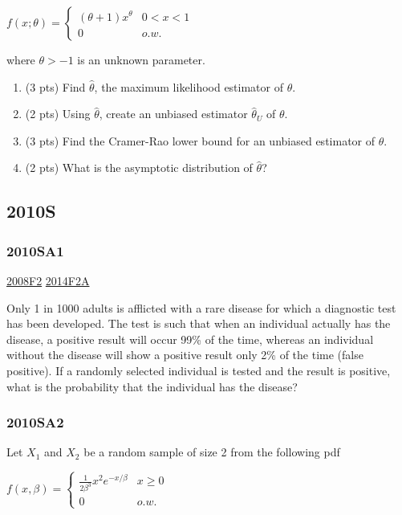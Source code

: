 \documentclass[6pt,twocolumn,Portrait]{article}
\begin{document}
\(f(x;\theta)=\begin{cases}(\theta+1)x^\theta& 0<x<1\\0& o.w.\end{cases}\)

where \(\theta>-1\) is an unknown parameter.

\begin{enumerate}
\def\labelenumi{(\alph{enumi})}
\item
  (3 pts) Find \(\hat\theta\), the maximum likelihood estimator of
  \(\theta\).
\item
  (2 pts) Using \(\hat\theta\), create an unbiased estimator
  \(\hat\theta_U\) of \(\theta\).
\item
  (3 pts) Find the Cramer-Rao lower bound for an unbiased estimator of
  \(\theta\).
\item
  (2 pts) What is the asymptotic distribution of \(\hat\theta\)?
\end{enumerate}

\hypertarget{s-4}{%
\subsection{2010S}\label{s-4}}

\hypertarget{sa1-1}{%
\subsubsection{2010SA1}\label{sa1-1}}

\protect\hyperlink{f2-3}{2008F2} \protect\hyperlink{f2a-1}{2014F2A}

Only 1 in 1000 adults is afflicted with a rare disease for which a
diagnostic test has been developed. The test is such that when an
individual actually has the disease, a positive result will occur 99\%
of the time, whereas an individual without the disease will show a
positive result only 2\% of the time (false positive). If a randomly
selected individual is tested and the result is positive, what is the
probability that the individual has the disease?

\hypertarget{sa2-1}{%
\subsubsection{2010SA2}\label{sa2-1}}

Let \(X_1\) and \(X_2\) be a random sample of size 2 from the following
pdf

\(f(x,\beta)=\begin{cases} \frac1{2\beta^3}x^2e^{-x/\beta}& x\ge0\\0& o.w.\end{cases}\)
\end{document}
